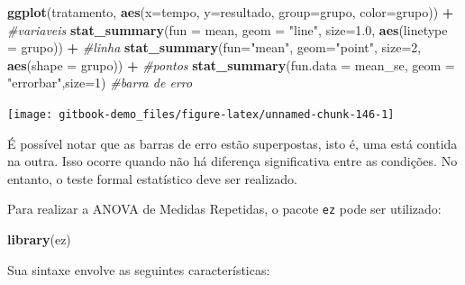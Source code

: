 \documentclass[
]{book}
\newenvironment{Shaded}{\begin{snugshade}}{\end{snugshade}}
\newcommand{\CommentTok}[1]{\textcolor[rgb]{0.56,0.35,0.01}{\textit{#1}}}
\newcommand{\DataTypeTok}[1]{\textcolor[rgb]{0.13,0.29,0.53}{#1}}
\newcommand{\DecValTok}[1]{\textcolor[rgb]{0.00,0.00,0.81}{#1}}
\newcommand{\FloatTok}[1]{\textcolor[rgb]{0.00,0.00,0.81}{#1}}
\newcommand{\KeywordTok}[1]{\textcolor[rgb]{0.13,0.29,0.53}{\textbf{#1}}}
\newcommand{\NormalTok}[1]{#1}
\newcommand{\OperatorTok}[1]{\textcolor[rgb]{0.81,0.36,0.00}{\textbf{#1}}}
\newcommand{\StringTok}[1]{\textcolor[rgb]{0.31,0.60,0.02}{#1}}
\begin{document}
\begin{Shaded}
\begin{Highlighting}[]
\KeywordTok{ggplot}\NormalTok{(tratamento, }\KeywordTok{aes}\NormalTok{(}\DataTypeTok{x=}\NormalTok{tempo, }\DataTypeTok{y=}\NormalTok{resultado, }\DataTypeTok{group=}\NormalTok{grupo, }\DataTypeTok{color=}\NormalTok{grupo)) }\OperatorTok{+}\StringTok{ }\CommentTok{#variaveis}
\StringTok{  }\KeywordTok{stat_summary}\NormalTok{(}\DataTypeTok{fun =}\NormalTok{ mean, }\DataTypeTok{geom =} \StringTok{"line"}\NormalTok{, }\DataTypeTok{size=}\FloatTok{1.0}\NormalTok{, }\KeywordTok{aes}\NormalTok{(}\DataTypeTok{linetype =}\NormalTok{ grupo)) }\OperatorTok{+}\StringTok{ }\CommentTok{#linha}
\StringTok{  }\KeywordTok{stat_summary}\NormalTok{(}\DataTypeTok{fun=}\StringTok{"mean"}\NormalTok{, }\DataTypeTok{geom=}\StringTok{"point"}\NormalTok{, }\DataTypeTok{size=}\DecValTok{2}\NormalTok{, }\KeywordTok{aes}\NormalTok{(}\DataTypeTok{shape =}\NormalTok{ grupo)) }\OperatorTok{+}\StringTok{ }\CommentTok{#pontos}
\StringTok{  }\KeywordTok{stat_summary}\NormalTok{(}\DataTypeTok{fun.data =}\NormalTok{ mean_se, }\DataTypeTok{geom =} \StringTok{"errorbar"}\NormalTok{,}\DataTypeTok{size=}\DecValTok{1}\NormalTok{) }\CommentTok{#barra de erro}
\end{Highlighting}
\end{Shaded}

\begin{center}\texttt{[image: gitbook-demo\_files/figure-latex/unnamed-chunk-146-1]} \end{center}

É possível notar que as barras de erro estão superpostas, isto é, uma
está contida na outra. Isso ocorre quando não há diferença significativa
entre as condições. No entanto, o teste formal estatístico deve ser
realizado.

Para realizar a ANOVA de Medidas Repetidas, o pacote \texttt{ez} pode
ser utilizado:

\begin{Shaded}
\begin{Highlighting}[]
\KeywordTok{library}\NormalTok{(ez)}
\end{Highlighting}
\end{Shaded}

Sua sintaxe envolve as seguintes características:
\end{document}
